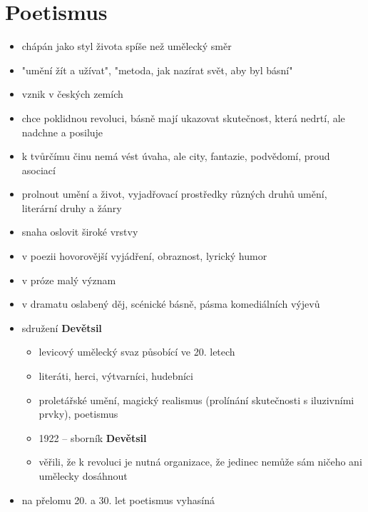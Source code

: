 \section{Poetismus}
\begin{itemize}
\item chápán jako styl života spíše než umělecký směr
\item "umění žít a užívat", "metoda, jak nazírat svět, aby byl básní"
\item vznik v českých zemích 
\item chce poklidnou revoluci, básně mají ukazovat skutečnost, která nedrtí, ale nadchne a posiluje
\item k tvůrčímu činu nemá vést úvaha, ale city, fantazie, podvědomí, proud asociací
\item prolnout umění a život, vyjadřovací prostředky různých druhů umění, literární druhy a žánry
\item snaha oslovit široké vrstvy
\item v poezii hovorovější vyjádření, obraznost, lyrický humor
\item v próze malý význam
\item v dramatu oslabený děj, scénické básně, pásma komediálních výjevů
\item sdružení \textbf{Devětsil}
	\begin{itemize}
	\item levicový umělecký svaz působící ve 20. letech 
	\item literáti, herci, výtvarníci, hudebníci
	\item proletářské umění, magický realismus (prolínání skutečnosti s iluzivními prvky), poetismus
	\item 1922 -- sborník \textbf{Devětsil}
	\item věřili, že k revoluci je nutná organizace, že jedinec nemůže sám ničeho ani umělecky dosáhnout
	\end{itemize}
\item na přelomu 20. a 30. let poetismus vyhasíná
\end{itemize}


